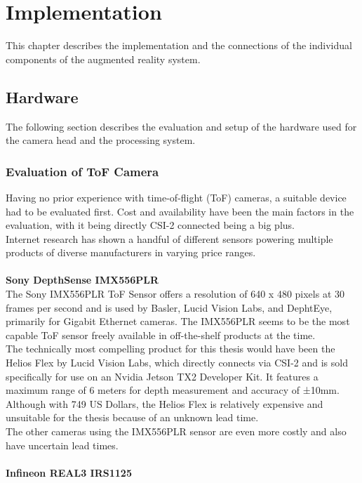 \chapter{Implementation}
\label{sec:Implementation}
This chapter describes the implementation and the connections of the individual components of the augmented reality system. 
\section{Hardware}
\label{sec:Hardware}
The following section describes the evaluation and setup of the hardware used for the camera head and the processing system.

\subsection{Evaluation of ToF Camera}
\label{sec:CamEvaluation}
Having no prior experience with time-of-flight (ToF) cameras, a suitable device had to be evaluated first. Cost and availability have been the main factors in the evaluation, with it being directly CSI-2 connected being a big plus.\\
Internet research has shown a handful of different sensors powering multiple products of diverse manufacturers in varying price ranges. \\
\\
\textbf{Sony DepthSense IMX556PLR}\\
The Sony IMX556PLR ToF Sensor offers a resolution of 640 x 480 pixels at 30 frames per second and is used by Basler, Lucid Vision Labs, and DephtEye, primarily for Gigabit Ethernet cameras. The IMX556PLR seems to be the most capable ToF sensor freely available in off-the-shelf products at the time.  \\
The technically most compelling product for this thesis would have been the Helios Flex by Lucid Vision Labs, which directly connects via CSI-2 and is sold specifically for use on an Nvidia Jetson TX2 Developer Kit. It features a maximum range of 6 meters for depth measurement and accuracy of ±10mm. Although with 749 US Dollars, the Helios Flex is relatively expensive and unsuitable for the thesis because of an unknown lead time.\\
The other cameras using the IMX556PLR sensor are even more costly and also have uncertain lead times.\\
\\
\textbf{Infineon REAL3 IRS1125}\\

